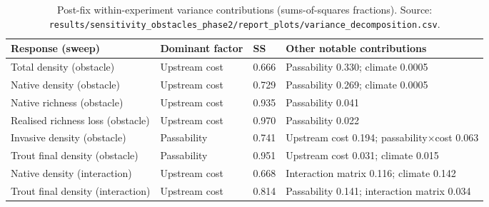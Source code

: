 \documentclass[11pt,a4paper]{article}
\begin{document}
\begin{table}[H]
\centering
\caption{Post-fix within-experiment variance contributions (sums-of-squares fractions). Source: \texttt{results/sensitivity\_obstacles\_phase2/report\_plots/variance\_decomposition.csv}.}
\label{tab:ss}
\small
\begin{tabularx}{\textwidth}{>{\raggedright\arraybackslash}p{}p{}p{}Y}
\toprule
Response (sweep) & Dominant factor & SS & Other notable contributions \\
\midrule
Total density (obstacle) & Upstream cost & 0.666 & Passability 0.330; climate 0.0005 \\
Native density (obstacle) & Upstream cost & 0.729 & Passability 0.269; climate 0.0005 \\
Native richness (obstacle) & Upstream cost & 0.935 & Passability 0.041 \\
Realised richness loss (obstacle) & Upstream cost & 0.970 & Passability 0.022 \\
Invasive density (obstacle) & Passability & 0.741 & Upstream cost 0.194; passability$\times$cost 0.063 \\
Trout final density (obstacle) & Passability & 0.951 & Upstream cost 0.031; climate 0.015 \\
Native density (interaction) & Upstream cost & 0.668 & Interaction matrix 0.116; climate 0.142 \\
Trout final density (interaction) & Upstream cost & 0.814 & Passability 0.141; interaction matrix 0.034 \\
\bottomrule
\end{tabularx}
\end{table}
\end{document}
